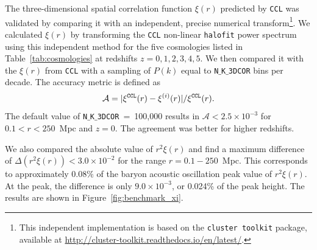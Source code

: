\documentclass[\docopts]{\docclass}
\newcommand{\ccl}{{\tt CCL}\xspace}
\newcommand{\halofit}{{\tt halofit}\xspace}
\begin{document}
The three-dimensional spatial correlation function $\xi(r)$ predicted by \ccl was validated by comparing it with an independent, precise numerical transform\footnote{This independent implementation is based on the {\tt cluster toolkit} package, available at \url{http://cluster-toolkit.readthedocs.io/en/latest/}.}. We calculated $\xi(r)$  by transforming the \ccl non-linear \halofit power spectrum using this independent method for the five cosmologies listed in Table~\ref{tab:cosmologies} at redshifts $z = 0,1,2,3,4,5$.  We then compared it with the $\xi(r)$ from \ccl with a sampling of $P(k)$ equal to {\tt N$\_$K$\_$3DCOR} bins per decade. The accuracy metric is defined as
\begin{equation}
  \mathcal{A}=|\xi^{\tt CCL}(r)-\xi^{(i)}(r)| / \xi^{\tt CCL}(r).
  \label{eq:accxi}
\end{equation}
The default value of {\tt N$\_$K$\_$3DCOR}~=~100,000 results in $\mathcal{A} < 2.5 \times 10^{-3}$ for $0.1 < r < 250$~Mpc and $z=0$. The agreement was better for higher redshifts.

We also compared the absolute value of $r^2 \xi(r)$ and find a maximum difference of $\Delta (r^2 \xi(r)) < 3.0 \times 10^{-2}$ for the range $r = 0.1 - 250$~Mpc. This corresponds to approximately $0.08\%$ of the baryon acoustic oscillation peak value of $r^2 \xi(r)$. At the peak, the difference is only $9.0 \times 10^{-3}$, or 0.024\% of the peak height. The results are shown in Figure~\ref{fig:benchmark_xi}.
\end{document}
